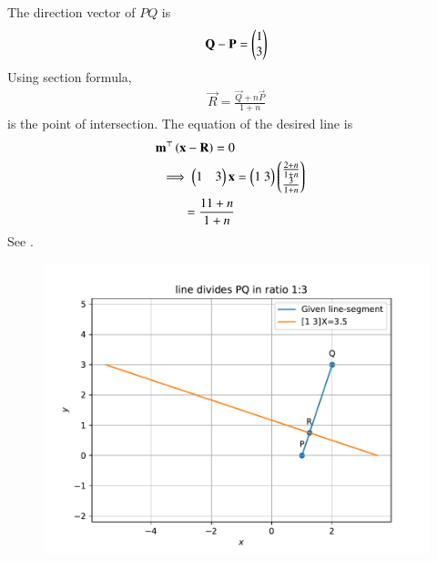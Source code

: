 The direction vector of 
$PQ$ is 
\begin{align}
     \mathbf{Q
 }-  \mathbf{P
 }
=
     \begin{pmatrix}
  1\\
  3
 \end{pmatrix}
\end{align}
 Using section formula, 
 \begin{align}
	 \vec{R}=\frac{\vec{Q}+n\vec{P}}{1+n}
\end{align}
is the point of intersection.
The 
equation of the desired line  is
\begin{align}
	\mathbf{m}^{\top}\left(\mathbf{x}-\mathbf{R}\right)=0
\\
\implies 
	   \begin{pmatrix}
		   1 &  3\end{pmatrix}\mathbf{x}
	   &= \begin{pmatrix}
  1\ 3\end{pmatrix}\begin{pmatrix}
  \frac{2+n}{1+n}\\
  \frac{3}{1+n}\end{pmatrix} 
  \\
	=	  \frac{11+n}{1+n} 
\end{align}
See
		.
	\begin{figure}[!ht]
		\centering
 \includegraphics[width=\columnwidth]{chapters/11/10/2/11/figs/linefig.pdf}
		\caption{}
		\label{fig:11/10/2/11}
  	\end{figure}
